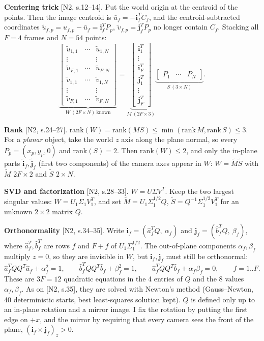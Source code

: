 \documentclass[10pt,letterpaper]{article}
\begin{document}
\textbf{Centering trick} [N2, s.12--14]. Put the world origin at the centroid of the points.
Then the image centroid is $\bar u_f=-\mathbf i_f^TC_f$, and the centroid-subtracted coordinates
$\tilde u_{f,p}=u_{f,p}-\bar u_f=\mathbf i_f^TP_p$, $\tilde v_{f,p}=\mathbf j_f^TP_p$ no longer
contain $C_f$. Stacking all $F=4$ frames and $N=54$ points:
\[
\underbrace{\begin{bmatrix}\tilde u_{1,1}&\cdots&\tilde u_{1,N}\\\vdots&&\vdots\\\tilde u_{F,1}&\cdots&\tilde u_{F,N}\\
\tilde v_{1,1}&\cdots&\tilde v_{1,N}\\\vdots&&\vdots\\\tilde v_{F,1}&\cdots&\tilde v_{F,N}\end{bmatrix}}_{W\ (2F\times N)\ \text{known}}
=\underbrace{\begin{bmatrix}\mathbf i_1^T\\\vdots\\\mathbf i_F^T\\\mathbf j_1^T\\\vdots\\\mathbf j_F^T\end{bmatrix}}_{M\ (2F\times3)}
\underbrace{\begin{bmatrix}P_1&\cdots&P_N\end{bmatrix}}_{S\ (3\times N)} .
\]

\textbf{Rank} [N2, s.24--27]. $\mathrm{rank}(W)=\mathrm{rank}(MS)\le\min(\mathrm{rank}\,M,\mathrm{rank}\,S)\le3$.
For a \emph{planar} object, take the world $z$ axis along the plane normal, so every
$P_p=(x_p,y_p,0)$ and $\mathrm{rank}(S)=2$. Then $\mathrm{rank}(W)\le2$, and only the in-plane
parts $\tilde{\mathbf i}_f,\tilde{\mathbf j}_f$ (first two components) of the camera axes appear in $W$:
$W=\tilde M\tilde S$ with $\tilde M$ $2F\times2$ and $\tilde S$ $2\times N$.

\textbf{SVD and factorization} [N2, s.28--33]. $W=U\Sigma V^T$. Keep the two largest singular
values: $W=U_1\Sigma_1V_1^T$, and set $\tilde M=U_1\Sigma_1^{1/2}Q$,
$\tilde S=Q^{-1}\Sigma_1^{1/2}V_1^T$ for an unknown $2\times2$ matrix $Q$.

\textbf{Orthonormality} [N2, s.34--35]. Write $\mathbf i_f=(\hat a_f^TQ,\ \alpha_f)$ and
$\mathbf j_f=(\hat b_f^TQ,\ \beta_f)$, where $\hat a_f^T,\hat b_f^T$ are rows $f$ and $F+f$ of
$U_1\Sigma_1^{1/2}$. The out-of-plane components $\alpha_f,\beta_f$ multiply $z=0$, so they are
invisible in $W$, but $\mathbf i_f,\mathbf j_f$ must still be orthonormal:
\[
\hat a_f^TQQ^T\hat a_f+\alpha_f^2=1,\qquad \hat b_f^TQQ^T\hat b_f+\beta_f^2=1,\qquad
\hat a_f^TQQ^T\hat b_f+\alpha_f\beta_f=0,\qquad f=1..F.
\]
These are $3F=12$ quadratic equations in the 4 entries of $Q$ and the 8 values $\alpha_f,\beta_f$.
As on [N2, s.35], they are solved with Newton's method (Gauss--Newton, 40 deterministic
starts, best least-squares solution kept). $Q$ is defined only up to an in-plane rotation and
a mirror image. I fix the rotation by putting the first edge on $+x$, and the mirror by
requiring that every camera sees the front of the plane, $(\mathbf i_f\times\mathbf j_f)_z>0$.
\end{document}

